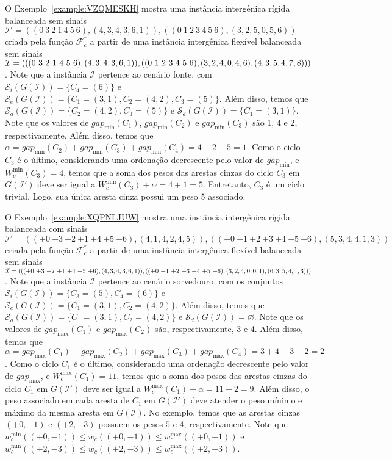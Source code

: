 \pagebreak

O Exemplo~\ref{example:VZQMESKH} mostra uma instância intergênica rígida balanceada sem sinais $\mathcal{I}' = ((0~3~2~1~4~5~6),(4,3,4,3,6,1)),((0~1~2~3~4~5~6),(3,2,5,0,5,6))$ criada pela função $\mathcal{F}_{c}^{''}$ a partir de uma instância intergênica flexível balanceada sem sinais $\mathcal{I} = (((0~3~2~1~4~5~6),(4,3,4,\break3,6,1)),((0~1~2~3~4~5~6),(3,2,4,0,4,6),(4,3,5,4,7,8)))$. Note que a instância $\mathcal{I}$ pertence ao cenário fonte, com $\mathcal{S}_i(G(\mathcal{I})) = \{C_4=(6)\}$ e $\mathcal{S}_e(G(\mathcal{I})) = \{C_1=(3,1),C_2=(4,2),C_3=(5)\}$. Além disso, temos que $\mathcal{S}_a(G(\mathcal{I})) = \{C_2=(4,2),C_3=(5)\}$ e $\mathcal{S}_d(G(\mathcal{I})) = \{C_1=(3,1)\}$. Note que os valores de $gap_{\min}(C_1)$, $gap_{\min}(C_2)$ e $gap_{\min}(C_3)$ são 1, 4 e 2, respectivamente. Além disso, temos que $\alpha = gap_{\min}(C_2) + gap_{\min}(C_3) + gap_{\min}(C_4) = 4 + 2 - 5 = 1$. Como o ciclo $C_3$ é o último, considerando uma ordenação decrescente pelo valor de $gap_{\min}$, e $W^{\min}_c(C_3) = 4$, temos que a soma dos pesos das arestas cinzas do ciclo $C_3$ em $G(\mathcal{I}')$ deve ser igual a $W^{\min}_c(C_3) + \alpha = 4 + 1 = 5$. Entretanto, $C_3$ é um ciclo trivial. Logo, sua única aresta cinza possui um peso $5$ associado.




\pagebreak

O Exemplo~\ref{example:XQPNLJUW} mostra uma instância intergênica rígida balanceada com sinais $\mathcal{I}' = (({+0}~{+3}~{+2}~{+1}~{+4}~{+5}~{+6}),(4,1,4,2,4,5)),(({+0}~{+1}~{+2}~{+3}~{+4}~{+5}~{+6}),(5,3,4,4,1,3))$ criada pela função $\mathcal{F}_{c}^{''}$ a partir de uma instância intergênica flexível balanceada sem sinais $\mathcal{I} = ((({+0}~{+3}~{+2}~{+1}~{+4}~{+5}~{+6}),(4,3,4,3,6,1)),(({+0}~{+1}~{+2}~{+3}~{+4}~{+5}~{+6}),(3,2,4,0,0,\break1),(6,3,5,4,1,3)))$. Note que a instância $\mathcal{I}$ pertence ao cenário sorvedouro, com os conjuntos $\mathcal{S}_i(G(\mathcal{I})) = \{C_3=(5),C_4=(6)\}$ e $\mathcal{S}_e(G(\mathcal{I})) = \{C_1=(3,1),C_2=(4,2)\}$. Além disso, temos que $\mathcal{S}_a(G(\mathcal{I})) = \{C_1=(3,1),C_2=(4,2)\}$ e $\mathcal{S}_d(G(\mathcal{I})) = \varnothing$. Note que os valores de $gap_{\max}(C_1)$ e $gap_{\max}(C_2)$ são, respectivamente, 3 e 4. Além disso, temos que $\alpha = gap_{\max}(C_1) + gap_{\max}(C_2) + gap_{\max}(C_3) + gap_{\max}(C_4) = 3 + 4 - 3 - 2 = 2$. Como o ciclo $C_1$ é o último, considerando uma ordenação decrescente pelo valor de $gap_{\max}$, e $W^{\max}_c(C_1) = 11$, temos que a soma dos pesos das arestas cinzas do ciclo $C_1$ em $G(\mathcal{I}')$ deve ser igual a $W^{\max}_c(C_1) - \alpha = 11 - 2 = 9$. Além disso, o peso associado em cada aresta de $C_1$ em $G(\mathcal{I}')$ deve atender o peso mínimo e máximo da mesma aresta em $G(\mathcal{I})$. No exemplo, temos que as arestas cinzas $({+0},{-1})$ e $({+2},{-3})$ possuem os pesos $5$ e $4$, respectivamente. Note que $w^{\min}_c(({+0},{-1})) \le w_c(({+0},{-1})) \le w^{\max}_c(({+0},{-1}))$ e $w^{\min}_c(({+2},{-3})) \le w_c(({+2},{-3})) \le w^{\max}_c(({+2},{-3}))$.


